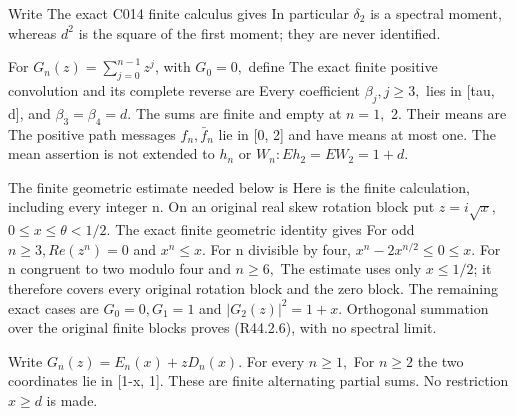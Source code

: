 Write
The exact C014 finite calculus gives
In particular \(\delta_2\) is a spectral moment, whereas \(d^2\) is the square of
the first moment; they are never identified.

For \(G_n(z)=\sum_{j=0}^{n-1}z^j\), with \(G_0=0,\allowbreak \) define
The exact finite positive convolution and its complete reverse are
Every coefficient \(\beta_j,\allowbreak  j\ge 3,\allowbreak \) lies in [tau, d], and \(\beta_3=\beta_4=d.\)
The sums are finite and empty at \(n=1,\allowbreak \) 2. Their means are
The positive path messages \(f_n,\allowbreak  \bar f_n\) lie in [0, 2] and have means at most
one. The mean assertion is not extended to \(h_n\) or \(W_n: Eh_2=EW_2=1+d.\)

The finite geometric estimate needed below is
Here is the finite calculation, including every integer n. On an
original real skew rotation block put \(z=i \sqrt{x}\), \(0\le x\le \theta<1/2.\)
The exact finite geometric identity gives
For odd \(n\ge 3,\allowbreak  Re(z^n)=0\) and \(x^n\le x.\) For n divisible by four,
\(x^n-2 x^{n/2}\)\ensuremath{\le}\(0\le x.\) For n congruent to two modulo four and
\(n\ge 6,\allowbreak \)
The estimate uses only \(x\le 1/2\); it therefore covers every original
rotation block and the zero block. The remaining exact cases are
\(G_0=0,\allowbreak  G_1=1\) and \(|G_2(z)|^2=1+x.\) Orthogonal summation over
the original finite blocks proves (R44.2.6), with no spectral limit.

Write \(G_n(z)=E_n(x)+zD_n(x).\) For every \(n\ge 1,\allowbreak \)
For \(n\ge 2\) the two coordinates lie in [1-x, 1]. These are finite
alternating partial sums. No restriction \(x\ge d\) is made.

